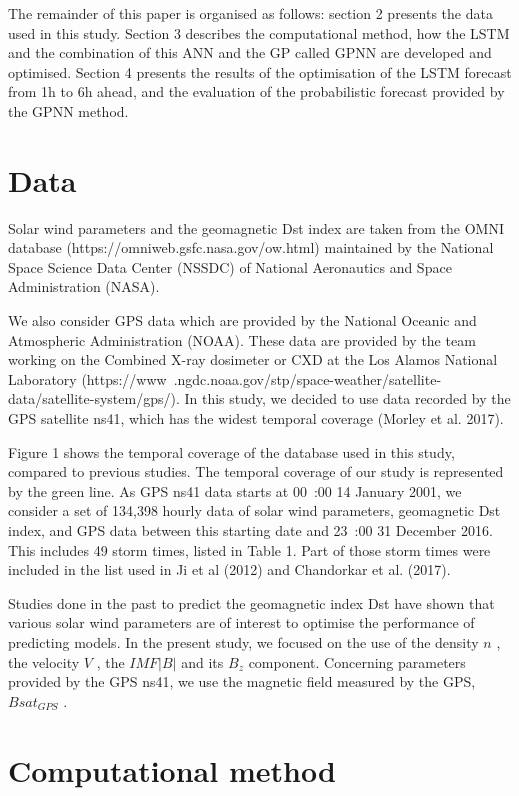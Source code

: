 The remainder of this paper is organised as follows: section 2 presents the data used in this study. 
Section 3 describes the computational method, how the LSTM and the combination of this ANN and the GP called 
GPNN are developed and optimised. Section 4 presents the results of the optimisation of the LSTM forecast 
from 1h to 6h ahead, and the evaluation of the probabilistic forecast provided by the GPNN method. 

\section{Data}

Solar wind parameters and the geomagnetic Dst index are taken from the OMNI database 
(https://omniweb.gsfc.nasa.gov/ow.html) maintained by the National Space Science Data Center (NSSDC) 
of National Aeronautics and Space Administration (NASA).

We also consider GPS data which are provided by the National Oceanic and Atmospheric Administration (NOAA). 
These data are provided by the team working on the Combined X-ray dosimeter or CXD at the 
Los Alamos National Laboratory (https://www .ngdc.noaa.gov/stp/space-weather/satellite-data/satellite-system/gps/). 
In this study, we decided to use data recorded by the GPS satellite ns41, which has the widest temporal coverage 
(Morley et al. 2017). 

Figure 1 shows the temporal coverage of the database used in this study, compared to previous studies. 
The temporal coverage of our study is represented by the green line. As GPS ns41 data starts at 
00 :00 14 January 2001, we consider a set of 134,398 hourly data of solar wind parameters, geomagnetic Dst index, 
and GPS data between this starting date and 23 :00 31 December 2016. This includes 49 storm times, listed in Table 1. 
Part of those storm times were included in the list used in Ji et al (2012) and Chandorkar et al. (2017). 

Studies done in the past to predict the geomagnetic index Dst have shown that various solar wind parameters 
are of interest to optimise the performance of predicting models. In the present study, we focused on the use 
of the density  \( n \) , the velocity  \( V \) , the  \( IMF \vert B \vert  \) and its  \( B_{z} \)  component. 
Concerning parameters provided by the GPS ns41, we use the magnetic field measured by the GPS,  \( Bsat_{GPS} \) .

\section{Computational method}


